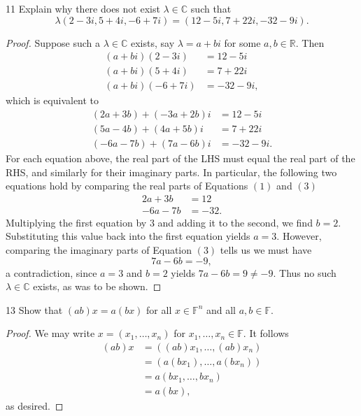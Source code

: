 \documentclass{extarticle}
\newenvironment{problem}[1]{\begin{prob*}{#1}{}}{\end{prob*}}
\newcommand{\R}{\mathbb{R}}
\newcommand{\C}{\mathbb{C}}
\newcommand{\F}{\mathbb{F}}
\begin{document}
\begin{problem}{11}
Explain why  there does not exist $\lambda\in\C$ such that
\begin{equation*}
\lambda(2-3i, 5 + 4i, -6 + 7i) = (12 - 5i, 7 + 22i, -32 - 9i).
\end{equation*}
\end{problem}
\begin{proof}
Suppose such a $\lambda\in\C$ exists, say $\lambda = a +bi$ for some $a,b\in\R$.  Then
\begin{align*}
(a+bi)(2-3i) &= 12-5i\\
(a+bi)(5+4i) &= 7 + 22i\\
(a+bi)(-6+7i) &= -32-9i,
\end{align*}
which is equivalent to
\begin{align}
(2a+3b) + (-3a+2b)i &= 12-5i \\
(5a-4b) + (4a+5b)i &= 7 + 22i\\
(-6a-7b) + (7a-6b)i &= -32-9i.
\end{align}
For each equation above, the real part of the LHS must equal the real part of the RHS, and similarly for their imaginary parts.  In particular, the following two equations hold by comparing the real parts of Equations $(1)$ and $(3)$
\begin{align*}
2a+3b &= 12\\
-6a-7b &= -32.
\end{align*}
Multiplying the first equation by $3$ and adding it to the second, we find $b=2$.  Substituting this value back into the first equation yields $a=3$.  However, comparing the imaginary parts of Equation $(3)$ tells us we must have
\begin{equation*}
7a-6b = -9,
\end{equation*}
a contradiction, since $a=3$ and $b=2$ yields $7a-6b = 9 \neq -9$.  Thus no such $\lambda\in\C$ exists, as was to be shown.
\end{proof}

\begin{problem}{13}
Show that $(ab)x = a(bx)$ for all $x\in\F^n$ and all $a,b\in\F$.
\end{problem}
\begin{proof}
We may write $x = (x_1, \dots, x_n)$ for $x_1,\dots,x_n\in\F$.  It follows
\begin{align*}
(ab)x &= \left((ab)x_1,\dots,(ab)x_n\right)\\
&= \left(a(bx_1),\dots,a(bx_n)\right)\\
&= a\left(bx_1,\dots,bx_n\right)\\
&= a(bx),
\end{align*}
as desired.
\end{proof}
\end{document}
